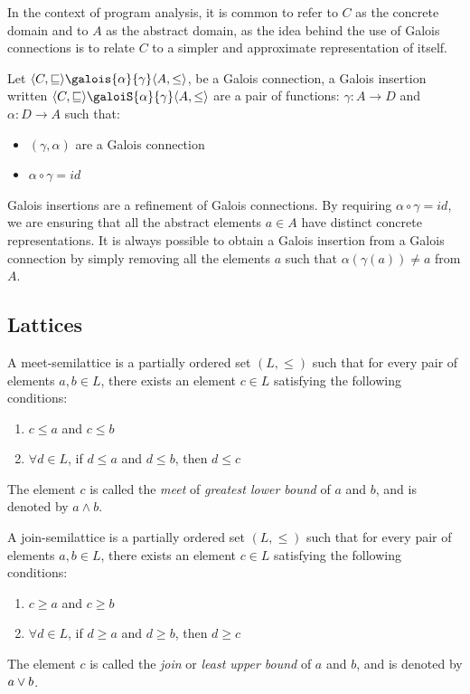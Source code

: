 \documentclass[
  10pt,       %
  twoside,    %
  a4paper,    %
  english,    %
  tikz,       %
  openright,  %
]{book}
\begin{document}
In the context of program analysis, it is common to refer to $C$ as the concrete
domain and to $A$ as the abstract domain, as the idea behind the use of Galois
connections is to relate $C$ to a simpler and approximate representation of
itself.

\begin{definition}
  Let $\langle C, \sqsubseteq \rangle \galois{\alpha}{\gamma} \langle A, \leq 
  \rangle$, be a Galois connection, a Galois insertion written 
  $\langle C, \sqsubseteq \rangle \galoiS{\alpha}{\gamma} \langle A, \leq \rangle$
  are a pair of functions: $\gamma : A \to D$ and $\alpha : D \to A$ such that:
  \begin{itemize}
    \item $(\gamma, \alpha)$ are a Galois connection
    \item $\alpha \circ \gamma = id$
  \end{itemize}
\end{definition}

Galois insertions are a refinement of Galois connections. By requiring $\alpha
\circ \gamma = id$, we are ensuring that all the abstract elements $a \in A$
have distinct concrete representations. It is always possible to obtain a
Galois insertion from a Galois connection by simply removing all the elements
$a$ such that $\alpha(\gamma(a)) \neq a$ from $A$.

\subsection{Lattices}

\begin{definition}
  A meet-semilattice is a partially ordered set \((L, \leq)\) such that for
  every pair of elements \(a, b \in L\), there exists an element \(c \in L\)
  satisfying the following conditions: 
  \begin{enumerate}
    \item \(c \leq a\) and \(c \leq b\) 
    \item \(\forall d \in L\), if \(d \leq a\) and \(d \leq b\), then \(d \leq c\) 
\end{enumerate}
  The element \(c\) is called the \emph{meet} of \emph{greatest lower bound} of
  \(a\) and \(b\), and is denoted by \(a \wedge b\).
\end{definition}

\begin{definition}
  A join-semilattice is a partially ordered set \((L, \leq)\) such that for
  every pair of elements \(a, b \in L\), there exists an element \(c \in L\)
  satisfying the following conditions: 
  \begin{enumerate}
    \item \(c \geq a\) and \(c \geq b\) 
    \item \(\forall d \in L\), if \(d \geq a\) and \(d \geq b\), then \(d \geq c\) 
\end{enumerate}
  The element \(c\) is called the \emph{join} or \emph{least upper bound} of
  \(a\) and \(b\), and is denoted by \(a \lor b\).
\end{definition}
\end{document}
